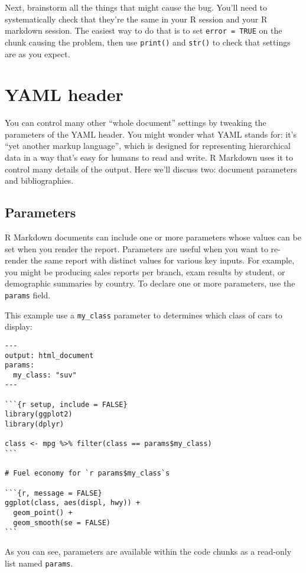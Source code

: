 \documentclass[]{book}
\begin{document}
Next, brainstorm all the things that might cause the bug. You'll need to
systematically check that they're the same in your R session and your R
markdown session. The easiest way to do that is to set
\texttt{error\ =\ TRUE} on the chunk causing the problem, then use
\texttt{print()} and \texttt{str()} to check that settings are as you
expect.

\section{YAML header}\label{yaml-header}

You can control many other ``whole document'' settings by tweaking the
parameters of the YAML header. You might wonder what YAML stands for:
it's ``yet another markup language'', which is designed for representing
hierarchical data in a way that's easy for humans to read and write. R
Markdown uses it to control many details of the output. Here we'll
discuss two: document parameters and bibliographies.

\subsection{Parameters}\label{parameters}

R Markdown documents can include one or more parameters whose values can
be set when you render the report. Parameters are useful when you want
to re-render the same report with distinct values for various key
inputs. For example, you might be producing sales reports per branch,
exam results by student, or demographic summaries by country. To declare
one or more parameters, use the \texttt{params} field.

This example use a \texttt{my\_class} parameter to determines which
class of cars to display:

\begin{verbatim}
---
output: html_document
params:
  my_class: "suv"
---

```{r setup, include = FALSE}
library(ggplot2)
library(dplyr)

class <- mpg %>% filter(class == params$my_class)
```

# Fuel economy for `r params$my_class`s

```{r, message = FALSE}
ggplot(class, aes(displ, hwy)) + 
  geom_point() + 
  geom_smooth(se = FALSE)
```
\end{verbatim}

As you can see, parameters are available within the code chunks as a
read-only list named \texttt{params}.
\end{document}
